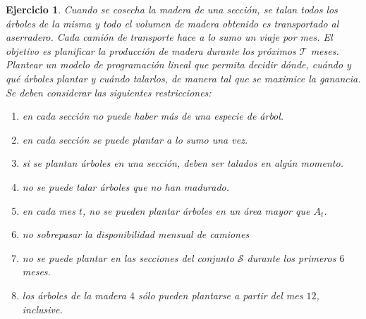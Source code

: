 \documentclass[a4paper,oneside,12pt]{amsart}
\newcommand{\mc}[1]{\mathcal{#1}}
\newtheorem{quest}{Ejercicio}
\begin{document}
\begin{quest}
    Cuando se cosecha la madera de una sección, se talan todos los árboles de la misma y todo el volumen de madera obtenido es transportado al aserradero. Cada camión de transporte hace a lo sumo un viaje por mes. El objetivo es planificar la producción de madera durante los próximos $\mc{T}$ meses. Plantear un modelo de programación lineal que permita decidir dónde, cuándo y qué árboles plantar y cuándo talarlos, de manera tal que se maximice la ganancia. Se deben considerar las siguientes restricciones:
    \begin{enumerate}
        \item en cada sección no puede haber más de una especie de árbol.
        \item en cada sección se puede plantar a lo sumo una vez.
        \item si se plantan árboles en una sección, deben ser talados en algún momento.
        \item no se puede talar árboles que no han madurado.
        \item en cada mes $t$, no se pueden plantar árboles en un área mayor que $A_t$.
        \item no sobrepasar la disponibilidad mensual de camiones
        \item no se puede plantar en las secciones del conjunto $\mc{S}$ durante los primeros $6$ meses.
        \item los árboles de la madera $4$ sólo pueden plantarse a partir del mes $12$, inclusive.
    \end{enumerate}
\end{quest}



\end{document}
